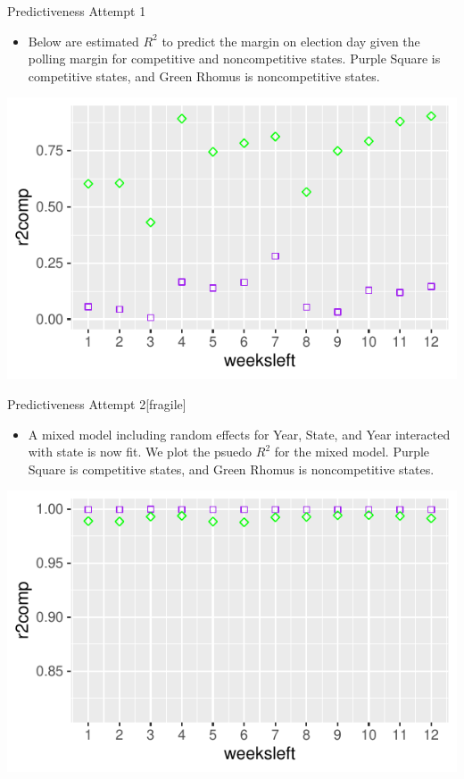 \documentclass{beamer}\usepackage[]{graphicx}\usepackage[]{color}
\makeatletter
\def\maxwidth{ %
  \ifdim\Gin@nat@width>\linewidth
    \linewidth
  \else
    \Gin@nat@width
  \fi
}
\newenvironment{knitrout}{}{} %
\makeatother
\begin{document}
\begin{frame}{Predictiveness Attempt 1}
\begin{itemize}
\item Below are estimated $R^2$ to predict the margin on election day given the polling margin for competitive and noncompetitive states. Purple Square is competitive states, and Green Rhomus is noncompetitive states.
\end{itemize}
\begin{knitrout}
\color{fgcolor}
\includegraphics[width=\maxwidth]{figure/unnamed-chunk-5-1} 

\end{knitrout}

\end{frame}

\begin{frame}{Predictiveness Attempt 2}[fragile]
\begin{itemize}
\item A mixed model including random effects for Year, State, and Year interacted with state is now fit.  We plot the psuedo $R^2$ for the mixed model. Purple Square is competitive states, and Green Rhomus is noncompetitive states.
\end{itemize}
\begin{knitrout}
\color{fgcolor}
\includegraphics[width=\maxwidth]{figure/unnamed-chunk-6-1} 

\end{knitrout}

\end{frame}
\end{document}
